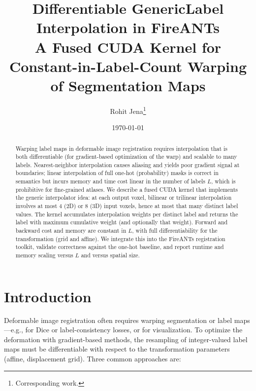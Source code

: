 \documentclass[11pt]{article}
\title{Differentiable GenericLabel Interpolation in FireANTs\\
\large A Fused CUDA Kernel for Constant-in-Label-Count Warping of Segmentation Maps}
\author{Rohit Jena\thanks{Corresponding work.}}
\date{\today}
\begin{document}
\maketitle

\begin{abstract}
Warping label maps in deformable image registration requires interpolation that is both differentiable (for gradient-based optimization of the warp) and scalable to many labels. Nearest-neighbor interpolation causes aliasing and yields poor gradient signal at boundaries; linear interpolation of full one-hot (probability) masks is correct in semantics but incurs memory and time cost linear in the number of labels $L$, which is prohibitive for fine-grained atlases. We describe a fused CUDA kernel that implements the generic interpolator idea: at each output voxel, bilinear or trilinear interpolation involves at most 4 (2D) or 8 (3D) input voxels, hence at most that many distinct label values. The kernel accumulates interpolation weights per distinct label and returns the label with maximum cumulative weight (and optionally that weight). Forward and backward cost and memory are constant in $L$, with full differentiability for the transformation (grid and affine). We integrate this into the FireANTs registration toolkit, validate correctness against the one-hot baseline, and report runtime and memory scaling versus $L$ and versus spatial size.
\end{abstract}

\section{Introduction}
\label{sec:intro}

Deformable image registration often requires warping segmentation or label maps---e.g., for Dice or label-consistency losses, or for visualization. To optimize the deformation with gradient-based methods, the resampling of integer-valued label maps must be differentiable with respect to the transformation parameters (affine, displacement grid). Three common approaches are:
\end{document}
